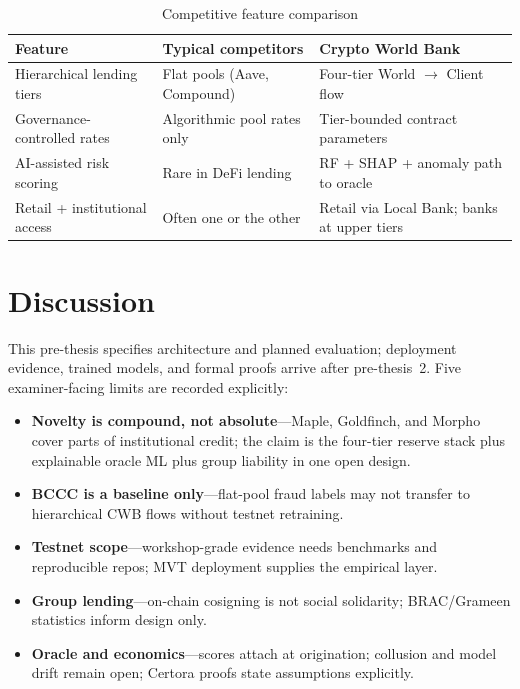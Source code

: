 \documentclass[12pt, a4paper]{report}
\newcommand{\tableheadcolor}{\rowcolor{TableHeadBg}}
\begin{document}
\begin{table}[H]
\centering
\caption[Competitive feature comparison]{Competitive feature comparison}
\label{tab:competitor-detailed}
\begin{tabular}{p{4cm}p{5cm}p{4.5cm}}
\toprule
\tableheadcolor
\textbf{Feature} & \textbf{Typical competitors} & \textbf{Crypto World Bank} \\
\midrule
Hierarchical lending tiers & Flat pools (Aave, Compound) & Four-tier World $\to$ Client flow \\
Governance-controlled rates & Algorithmic pool rates only & Tier-bounded contract parameters \\
AI-assisted risk scoring & Rare in DeFi lending & RF + SHAP + anomaly path to oracle \\
Retail + institutional access & Often one or the other & Retail via Local Bank; banks at upper tiers \\
\bottomrule
\end{tabular}
\end{table}

\section{Discussion}
\label{sec:ch5-discussion}
\label{sec:research-limitations}
\label{sec:bangladesh-reg}

This pre-thesis specifies architecture and planned evaluation; deployment evidence, trained models, and formal proofs arrive after pre-thesis~2. Five examiner-facing limits are recorded explicitly:

\begin{itemize}[noitemsep]
\item \textbf{Novelty is compound, not absolute}---Maple, Goldfinch, and Morpho cover parts of institutional credit; the claim is the four-tier reserve stack plus explainable oracle ML plus group liability in one open design.
\item \textbf{BCCC is a baseline only}---flat-pool fraud labels may not transfer to hierarchical CWB flows without testnet retraining.
\item \textbf{Testnet scope}---workshop-grade evidence needs benchmarks and reproducible repos; MVT deployment supplies the empirical layer.
\item \textbf{Group lending}---on-chain cosigning is not social solidarity; BRAC/Grameen statistics inform design only.
\item \textbf{Oracle and economics}---scores attach at origination; collusion and model drift remain open; Certora proofs state assumptions explicitly.
\end{itemize}
\end{document}
